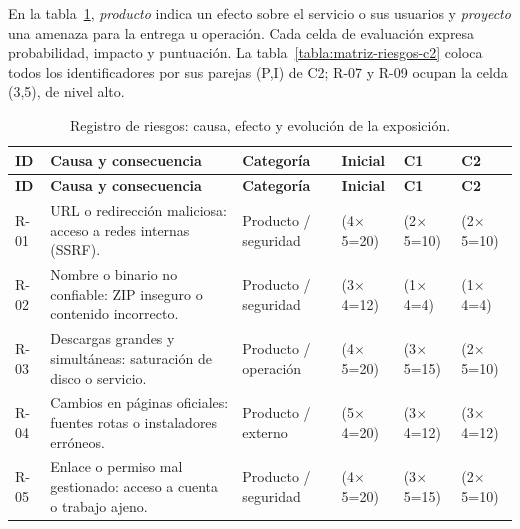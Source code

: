 En la tabla~\ref{tabla:riesgos}, \emph{producto} indica un efecto sobre el servicio o sus usuarios y \emph{proyecto} una amenaza para la entrega u operación. Cada celda de evaluación expresa probabilidad, impacto y puntuación. La tabla~\ref{tabla:matriz-riesgos-c2} coloca todos los identificadores por sus parejas (P,I) de C2; R-07 y R-09 ocupan la celda (3,5), de nivel alto.

{\footnotesize
	\setlength{\tabcolsep}{3pt}
	\begin{longtable}{p{}p{}p{}p{}p{}p{}}
		\caption{Registro de riesgos: causa, efecto y evolución de la exposición.}\label{tabla:riesgos}                                                                                                      \\
		\toprule
		\textbf{ID} & \textbf{Causa y consecuencia}                                            & \textbf{Categoría}   & \textbf{Inicial}           & \textbf{C1}                & \textbf{C2}                \\
		\midrule
		\endfirsthead
		\toprule
		\textbf{ID} & \textbf{Causa y consecuencia}                                            & \textbf{Categoría}   & \textbf{Inicial}           & \textbf{C1}                & \textbf{C2}                \\
		\midrule
		\endhead
		R-01        & URL o redirección maliciosa: acceso a redes internas (SSRF).             & Producto / seguridad & (4\ensuremath{\times}5=20) & (2\ensuremath{\times}5=10) & (2\ensuremath{\times}5=10) \\
		R-02        & Nombre o binario no confiable: ZIP inseguro o contenido incorrecto.      & Producto / seguridad & (3\ensuremath{\times}4=12) & (1\ensuremath{\times}4=4)  & (1\ensuremath{\times}4=4)  \\
		R-03        & Descargas grandes y simultáneas: saturación de disco o servicio.         & Producto / operación & (4\ensuremath{\times}5=20) & (3\ensuremath{\times}5=15) & (2\ensuremath{\times}5=10) \\
		R-04        & Cambios en páginas oficiales: fuentes rotas o instaladores erróneos.     & Producto / externo   & (5\ensuremath{\times}4=20) & (3\ensuremath{\times}4=12) & (3\ensuremath{\times}4=12) \\
		R-05        & Enlace o permiso mal gestionado: acceso a cuenta o trabajo ajeno.        & Producto / seguridad & (4\ensuremath{\times}5=20) & (3\ensuremath{\times}5=15) & (2\ensuremath{\times}5=10) \\

\end{longtable}}
